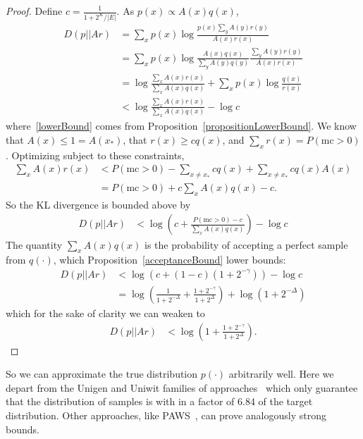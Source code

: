 \documentclass{article}
\begin{document}
  \begin{proof}
      Define $c=\frac{1}{1 + 2^K/|E|}$. As $p(x)\propto A(x)q(x)$,
    \begin{align}
      D(p||Ar)& = \sum_x p(x)\log \frac{p(x)\sum_y A(y)r(y)}{A(x)r(x)}\\
      & = \sum_x p(x)\log \frac{A(x)q(x)}{\sum_y A(y)q(y)}\frac{\sum_y A(y)r(y)}{A(x)r(x)} \\ %
      & = \log \frac{\sum_x A(x)r(x)}{\sum_x A(x)q(x)} + \sum_x p(x)\log \frac{q(x)}{r(x)}\\
      &  < \log \frac{\sum_x A(x)r(x)}{\sum_x A(x)q(x)} - \log c\label{lowerBound}
    \end{align}
    where~\ref{lowerBound} comes from Proposition~\ref{propositionLowerBound}.
    We know that $A(x)\leq 1 = A(x_*)$, that $r(x) \geq c q(x)$, and $\sum_x r(x) = P(\text{mc} > 0)$.
    Optimizing subject to these constraints,
    \begin{align}
      \sum_x A(x) r(x) &  < P(\text{mc} > 0) - \sum_{x\not= x_*} cq(x) +\sum_{x\not= x_*} cq(x)A(x)\nonumber\\
      & = P(\text{mc} > 0) + c \sum_{x} A(x) q(x) - c.
    \end{align}
    So the KL divergence is bounded above by
    \begin{align}
      D(p||Ar)&  < \log \left( c + \frac{P(\text{mc} > 0) -c }{\sum_x A(x)q(x)}\right) - \log c
    \end{align}
    The quantity $\sum_x A(x)q(x)$ is the probability of accepting a perfect sample from $q(\cdot )$,
    which Proposition~\ref{acceptanceBound} lower bounds:
    \begin{align}
      D(p||Ar)&  < \log \left( c + (1 -c)(1 + 2^{ - \gamma})\right) - \log c\\
      & = \log \left( \frac{1}{1 + 2^{ - \Delta}} + \frac{1 + 2^{ - \gamma}}{1 + 2^\Delta}\right)  + \log (1 + 2^{ - \Delta})
    \end{align}
    which for the sake of clarity we can weaken to%
    \begin{align}
      D(p||Ar)&  < \log \left( 1 + \frac{1 + 2^{ - \gamma}}{1 + 2^\Delta}\right) . %
    \end{align}
  \end{proof}
  So we can approximate the true distribution $p(\cdot )$ arbitrarily well.
  Here we depart from the Unigen and Uniwit families of approaches~\cite{chakraborty2014distribution,chakraborty2014balancing} which only guarantee that the distribution of samples is with in a factor of 6.84 of the target distribution.
  Other approaches, like PAWS~\cite{ermon2013embed}, can prove analogously strong bounds.
\end{document}
